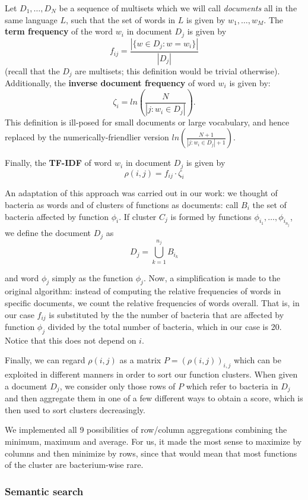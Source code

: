 \documentclass{article}
\begin{document}
Let $D_1, \dots, D_N$ be a sequence of multisets which we will call \textit{documents} all in the same language $L$, such that the set of words in $L$ is given by $w_1, \dots, w_M$. The \textbf{term frequency} of the word $w_i$ in document $D_j$ is given by
\[
    f_{ij} = \frac{|\{w\in D_j \colon w=w_i\}|}{|D_j|}
\]
(recall that the $D_j$ are multisets; this definition would be trivial otherwise). Additionally, the \textbf{inverse document frequency} of word $w_i$ is given by:
\[
    \zeta_i = ln\left(\frac{N}{|j\colon w_i\in D_j|}\right)
.\]
This definition is ill-posed for small documents or large vocabulary, and hence replaced by the numerically-friendlier version $ln\left(\frac{N +1}{|j\colon w_i\in D_j| + 1}\right)$.

Finally, the \textbf{TF-IDF} of word $w_i$ in document $D_j$ is given by
\[
    \rho(i, j) = f_{ij}\cdot \zeta_i
\]

An adaptation of this approach was carried out in our work: we thought of bacteria as words and of clusters of functions as documents: call $B_i$ the set of bacteria affected by function $\phi_i$. If cluster $C_j$ is formed by functions $\phi_{i_1}, \dots, \phi_{i_{n_j}}$, we define the document $D_j$ as
\[
    D_j = \bigcup_{k=1}^{n_j} B_{i_k}
\]

and word $\phi_j$ simply as the function $\phi_j$. Now, a simplification is made to the original algorithm: instead of computing the relative frequencies of words in specific documents, we count the relative frequencies of words overall. That is, in our case $f_{ij}$ is substituted by the the number of bacteria that are affected by function $\phi_j$ divided by the total number of bacteria, which in our case is 20. Notice that this does not depend on $i$.

Finally, we can regard $\rho(i,j)$ as a matrix $P = (\rho(i,j))_{i,j}$ which can be exploited in different manners in order to sort our function clusters. When given a document $D_j$, we consider only those rows of $P$ which refer to bacteria in $D_j$ and then aggregate them in one of a few different ways to obtain a score, which is then used to sort clusters decreasingly.

We implemented all 9 possibilities of row/column aggregations combining the minimum, maximum and average. For us, it made the most sense to maximize by columns and then minimize by rows, since that would mean that most functions of the cluster are bacterium-wise rare.

\subsubsection{Semantic search}
\end{document}
